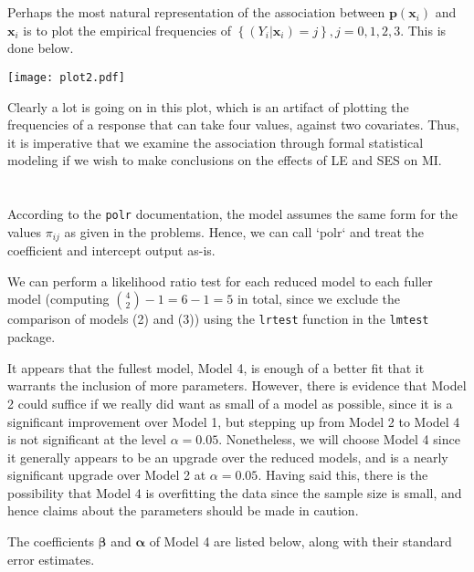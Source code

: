 \documentclass[11pt]{article}
\newcommand*\set[1]{\left\{#1\right\}}
\newcommand*\bx{\mathbf{x}}
\newcommand*\bp{\mathbf{p}}
\newcommand*\balpha{\boldsymbol{\alpha}}
\newcommand*\bbeta{\boldsymbol{\beta}}
\renewcommand\;{\,}
\begin{document}
\section{}
Perhaps the most natural representation of the association between 
$\bp(\bx_i)$ and $\bx_i$ is to plot the empirical frequencies of 
$\set{(Y_i | \bx_i) = j}, j = 0, 1, 2, 3$. This is done below.
\begin{center}
\texttt{[image: plot2.pdf]}
\end{center}
Clearly a lot is going on in this plot, which is an artifact of plotting the frequencies of a response that can take four values, against two covariates.
Thus, it is imperative that we examine the association through formal statistical modeling if we wish to make conclusions on the effects of LE and SES on MI. 

\section{}
According to the \texttt{polr} documentation, the model assumes the same form for the values $\pi_{ij}$ as given in the problems. Hence, we can call `polr` and treat the coefficient and intercept output as-is. 

We can perform a likelihood ratio test for each reduced model to each fuller model (computing ${4 \choose 2} - 1 = 6 - 1 = 5$ in total, since we exclude the comparison of models (2) and (3)) using the \texttt{lrtest} function in the \texttt{lmtest} package. 



It appears that the fullest model, Model 4, is enough of a better fit that it warrants the inclusion of more parameters. However, there is evidence that Model 2 could suffice if we really did want as small of a model as possible, since it is a significant improvement over Model 1, but stepping up from Model 2 to Model 4 is not significant at the level $\alpha = 0.05$. Nonetheless, we will choose Model 4 since it generally appears to be an upgrade over the reduced models, and is a nearly significant upgrade over Model 2 at $\alpha = 0.05$. Having said this, there is the possibility that Model 4 is overfitting the data since the sample size is small, and hence claims about the parameters should be made in caution.

The coefficients $\bbeta$ and $\balpha$ of Model 4 are listed below, along with their standard error estimates.


\end{document}
